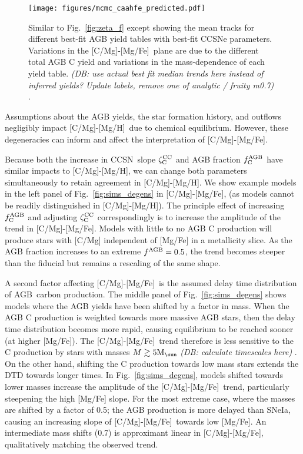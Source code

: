 \documentclass[fleqn,
usenatbib]{mnras}
\newcommand{\agb}{AGB}
\newcommand{\cc}{CCSN}
\newcommand{\caah}{[C/Mg]-[Mg/H]}
\newcommand{\caafe}{[C/Mg]-[Mg/Fe]}
\newcommand{\zcc}{\zeta_{\rm C}^{\rm CC}}
\newcommand{\fagb}{f_{\rm C}^{\rm AGB}}
\newcommand{\Mo}{ {\rm M}_{\sun}}
\newcommand{\dbnote}[1]{ {\color{Thistle} \textit{\small (DB: #1)}} }
\begin{document}
\begin{figure}
    \texttt{[image: figures/mcmc\_caahfe\_predicted.pdf]}

    \caption[]{
        Similar to Fig.~\ref{fig:zeta_f} except showing the mean tracks for different best-fit AGB yield tables with best-fit CCSNe parameters. Variations in the \caafe\ plane are due to the different total AGB C yield and variations in the mass-dependence of each yield table.
    \dbnote{use actual best fit median trends here instead of inferred yields? Update labels, remove one of analytic / fruity m0.7}.
    }
    \label{fig:agb_predictions}
\end{figure}

Assumptions about the AGB yields, the star formation history, and outflows negligibly impact \caah\ due to chemical equilibrium. However, these degeneracies can inform and affect the interpretation of \caafe. 

Because both the increase in \cc\ slope $\zcc$ and AGB fraction $\fagb$ have similar impacts to \caah, we can change both parameters simultaneously to retain agreement in \caah. We show example models in the left panel of Fig.~\ref{fig:sims_degens} in \caafe, (as models cannot be readily distinguished in \caah). The principle effect of increasing $\fagb$ and adjusting $\zcc$ correspondingly is to increase the amplitude of the trend in \caafe. Models with little to no AGB C production will produce stars with [C/Mg] independent of [Mg/Fe] in a metallicity slice. As the AGB fraction increases to an extreme $f^{\rm AGB}=0.5$, the trend becomes steeper than the fiducial but remains a rescaling of the same shape. 


A second factor affecting \caafe\ is the assumed delay time distribution of \agb\ carbon production.
The middle panel of Fig.~\ref{fig:sims_degens} shows models where the AGB yields have been shifted by a factor in mass. When the AGB C production is weighted towards more massive AGB stars, then the delay time distribution becomes more rapid, causing equilibrium to be reached sooner (at higher [Mg/Fe]). The \caafe\ trend therefore is less sensitive to the C production by stars with masses $M \gtrsim 5 \Mo$ \dbnote{calculate timescales here}. On the other hand, shifting the C production towards low mass stars extends the DTD towards longer times. In Fig.~\ref{fig:sims_degens}, models shifted towards lower masses increase the amplitude of the \caafe\ trend, particularly steepening the high [Mg/Fe] slope. For the most extreme case, where the masses are shifted by a factor of 0.5; the AGB production is more delayed than SNeIa, causing an increasing slope of \caafe\ towards low [Mg/Fe]. An intermediate mass shifts (0.7) is approximant linear in \caafe, qualitatively matching the observed trend. 
\end{document}

